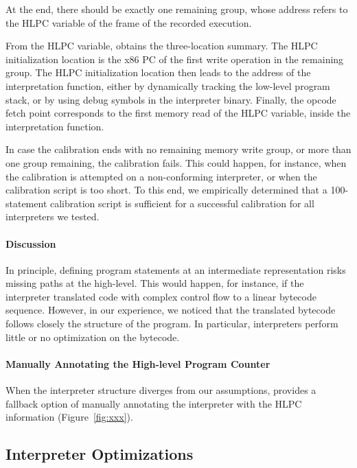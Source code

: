 At the end, there should be exactly one remaining group, whose address refers to the HLPC variable of the frame of the recorded execution.

From the HLPC variable, \chef obtains the three-location summary.
%
The HLPC initialization location is the x86 PC of the first write operation in the remaining group.
%
The HLPC initialization location then leads to the address of the interpretation function, either by dynamically tracking the low-level program stack, or by using debug symbols in the interpreter binary.
%
Finally, the opcode fetch point corresponds to the first memory read of the HLPC variable, inside the interpretation function.

In case the calibration ends with no remaining memory write group, or more than one group remaining, the calibration fails.
%
This could happen, for instance, when the calibration is attempted on a non-conforming interpreter, or when the calibration script is too short.  To this end, we empirically determined that a 100-statement calibration script is sufficient for a successful calibration for all interpreters we tested.

\paragraph{Discussion}

In principle, defining program statements at an intermediate representation risks missing paths at the high-level.
%
This would happen, for instance, if the interpreter translated code with complex control flow to a linear bytecode sequence.
%
However, in our experience, we noticed that the translated bytecode follows closely the structure of the program.
%
In particular, interpreters perform little or no optimization on the bytecode.

\paragraph{Manually Annotating the High-level Program Counter}

When the interpreter structure diverges from our assumptions, \chef provides a fallback option of manually annotating the interpreter with the HLPC information (Figure~\ref{fig:xxx}).

\subsection{Interpreter Optimizations}
\label{sec:chef:optimzeforsymbex}

